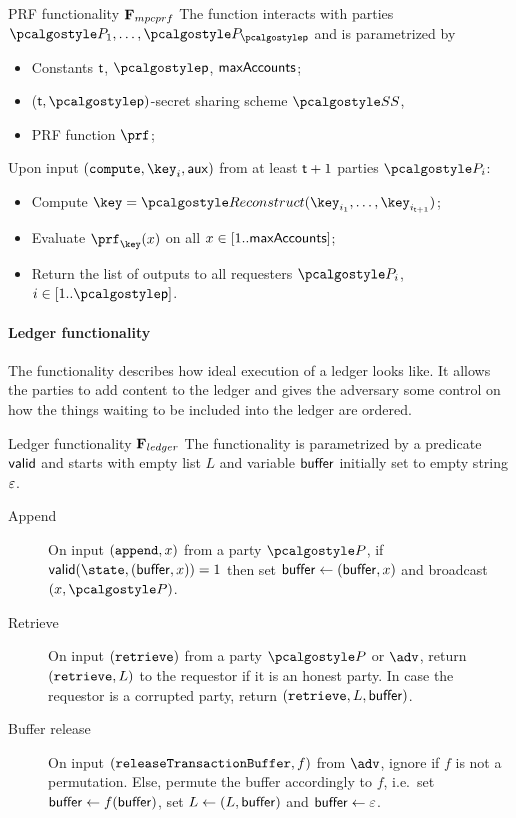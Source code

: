 \documentclass[runningheads,10pt]{llncs}
\numberwithin{equation}{section}
\begin{document}
\begin{funcbox}{PRF functionality $\mathbf{F}_{{mpcprf}}$}
  The function interacts with parties $\party_1, \ldots, \party_\noofparties$
  and is parametrized by
  \begin{itemize}
  \item Constants $\mathsf{t}$, $\noofparties$, $\mathsf{maxAccounts}$;
  \item ($\threshold, \noofparties)$-secret sharing scheme $\SS$,
  \item PRF function $\prf$;
  \end{itemize}

  Upon input $(\compute, \key_i, \aux)$ from at least $\mathsf{t} + 1$ parties
  $\party_i$:
  \begin{itemize}
  \item Compute $\key = \reconstruct(\key_{i_1}, \ldots, \key_{i_{\threshold +
        1}})$;
  \item Evaluate $\prf_\key(x)$ on all $x \in [1 .. \mathsf{maxAccounts}]$;
  \item Return the list of outputs to all requesters $\party_i$, $i \in
  \range{1}{\noofparties}$.
  \end{itemize}
\end{funcbox}

\paragraph{Ledger functionality}
The functionality describes how ideal execution of a ledger looks like. It
allows the parties to add content to the ledger and gives the adversary some
control on how the things waiting to be included into the ledger are ordered.
\begin{funcbox}{Ledger functionality $\mathbf{F}_{{ledger}}$} The functionality is
  parametrized by a predicate $\mathsf{valid}$ and starts with empty list $L$ and
  variable $\mathsf{buffer}$ initially set to empty string $\varepsilon$.
  \begin{description}
  \item[Append]
    On input $(\mathtt{append}, x)$ from a party $\party$, if $\valid(\state, (\buffer,
    x)) = 1$ then set $\mathsf{buffer} \gets (\mathsf{buffer}, x)$ and broadcast $(x, \party)$.
  \item[Retrieve]
    On input $(\mathtt{retrieve})$ from a party $\party$ or $\adv$, return $(\mathtt{retrieve},
    L)$ to the requestor if it is an honest party. In case the requestor is a
    corrupted party, return $(\mathtt{retrieve}, L, \mathsf{buffer})$.
  \item[Buffer release]
    On input $(\mathtt{releaseTransactionBuffer}, f)$ from $\adv$, ignore if $f$ is not
    a permutation. Else, permute the buffer accordingly to $f$, i.e.~set
    $\mathsf{buffer} \gets f(\mathsf{buffer})$, set $L \gets (L, \mathsf{buffer})$ and $\mathsf{buffer} \gets
    \varepsilon$.
  \end{description}

\end{funcbox}
\end{document}

